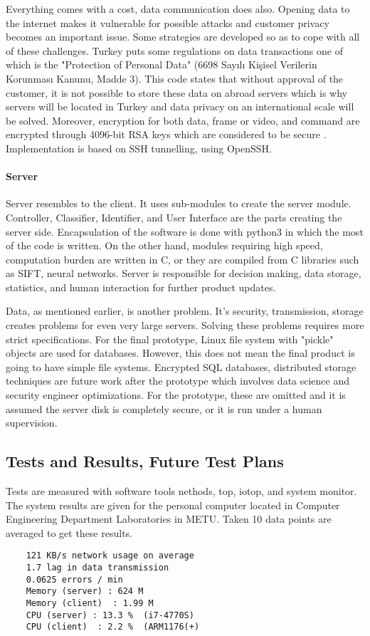 Everything comes with a cost, data communication does also. Opening data to the internet makes it vulnerable for possible attacks and customer privacy becomes an important issue. Some strategies are developed so as to cope with all of these challenges. Turkey puts some regulations on data transactions one of which is the "Protection of Personal Data" (6698 Sayılı Kişisel Verilerin Korunması Kanunu, Madde 3). This code states that without approval of the customer, it is not possible to store these data on abroad servers which is why servers will be located in Turkey and data privacy on an international scale will be solved. Moreover, encryption for both data, frame or video, and command are encrypted through 4096-bit RSA keys which are considered to be secure \cite{cite:RSA}. Implementation is based on SSH tunnelling, using OpenSSH.

\paragraph{Server}
Server resembles to the client. It uses sub-modules to create the server module. Controller, Classifier, Identifier, and User Interface are the parts creating the server side. Encapsulation of the software is done with python3 in which the most of the code is written. On the other hand, modules requiring high speed, computation burden are written in C, or they are compiled from C libraries such as SIFT, neural networks. Server is responsible for decision making, data storage, statistics, and human interaction for further product updates.

Data, as mentioned earlier, is another problem. It's security, transmission, storage creates problems for even very large servers. Solving these problems requires more strict specifications. For the final prototype, Linux file system with "pickle" objects are used for databases. However, this does not mean the final product is going to have simple file systems. Encrypted SQL databases, distributed storage techniques are future work after the prototype which involves data science and security engineer optimizations. For the prototype, these are omitted and it is assumed the server disk is completely secure, or it is run under a human supervision.


\subsection{Tests and Results, Future Test Plans}
Tests are measured with software tools nethods, top, iotop, and system monitor. The system results are given for the personal computer located in Computer Engineering Department Laboratories in METU. Taken 10 data points are averaged to get these results.

\begin{verbatim}
    121 KB/s network usage on average
    1.7 lag in data transmission
    0.0625 errors / min
    Memory (server) : 624 M
    Memory (client)  : 1.99 M
    CPU (server) : 13.3 %  (i7-4770S)
    CPU (client)  : 2.2 %  (ARM1176(+)
\end{verbatim}

